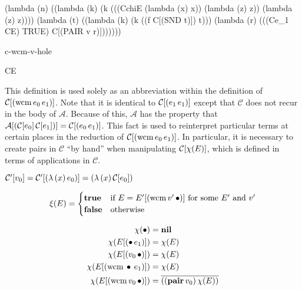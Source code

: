 \begin{schemedefn}{}
\begin{schemedisplay}
(lambda (n) ((lambda (k) 
               (k (((CchiE (lambda (x) x)) (lambda (z) z)) (lambda (z) z))))
             (lambda (t) 
               ((lambda (k) (k ((f C[(SND t)]) t)))
                  (lambda (r) 
                    (((Ce_1 CE) TRUE) C[(PAIR v r)]))))))
\end{schemedisplay}
\end{schemedefn}

\begin{namedschemedefn}{c-wcm-v-hole}{}
\begin{schemedisplay}
CE
\end{schemedisplay}
\end{namedschemedefn}

This definition is used solely as an abbreviation within the definition of
$\mathcal{C}[(\mathrm{wcm}\,e_0\,e_1)]$. Note that it is identical to $\mathcal{C}[(e_1\,e_1)]$ except that
$\mathcal{C}$ does not recur in the body of $\mathcal{A}$. Because of this, $\mathcal{A}$
has the property that $\mathcal{A}[(\mathcal{C}[e_0]\,\mathcal{C}[e_1])]=\mathcal{C}[(e_0\,e_1)]$. This fact
is used to reinterpret particular terms at certain places in the reduction of
$\mathcal{C}[(\mathrm{wcm}\,e_0\,e_1)]$. In particular, it is necessary to create pairs in $\mathcal{C}$ ``by
hand'' when manipulating $\mathcal{C}[\chi(E)]$, which is defined in terms of applications in
$\mathcal{C}$.

\begin{defn}
$\mathcal{C}'[v_0]=\mathcal{C}'[(\lambda\,(x)\,e_0)]=(\lambda\,(x)\,\mathcal{C}[e_0])$
\end{defn}

\begin{defn}
\[
\xi(E)=\begin{cases}
\mathbf{true} &\text{if $E=E'[(\mathrm{wcm}\,v'\,\bullet)]$ for some $E'$ and $v'$}\\
\mathbf{false} &\text{otherwise}
\end{cases}
\]
\end{defn}

\begin{defn}
\begin{align*}
\chi(\bullet)               &= \mathbf{nil}\\
\chi(E[(\bullet\,e_1)]) &= \chi(E)\\
\chi(E[(v_0\,\bullet)]) &= \chi(E)\\
\chi(E[(\mathrm{wcm}\,\bullet\,e_1)]) &= \chi(E)\\
\chi(E[(\mathrm{wcm}\,v_0\,\bullet)]) &= \overline{((\mathbf{pair}\,v_0)\,\chi(E))}\\
\end{align*}
\end{defn}

